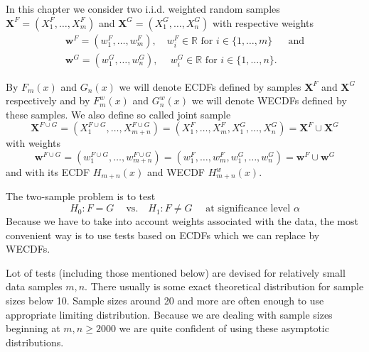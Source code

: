 In this chapter we consider two i.i.d. weighted random samples $\mathbf{X}^F = (X^F_1,\ldots, X^F_m)$ and $\mathbf{X}^G = (X^G_1, \ldots, X^G_n)$ with respective weights 
\begin{align*}
\mathbf{w}^F = (w^F_1,\ldots, w^F_m), \quad w_i^F \in \mathbb{R} \text{ for }  i \in \lbrace 1, \ldots, m \rbrace &\text{ and} \\
\mathbf{w}^G = (w^G_1,\ldots, w^G_n), \:
\quad w_i^G \in \mathbb{R} \text{ for } i \in \lbrace 1, \ldots, n \rbrace. &
\end{align*}

By $F_m(x) $ and $ G_n(x)$ we will denote ECDFs defined by samples $\mathbf{X}^F$ and $\mathbf{X}^G$ respectively and by $F^w_m(x)$ and $ G^w_n(x)$ we will denote WECDFs defined by these samples. We also define so called joint sample 
\begin{equation}
\mathbf{X}^{F\cup G} = (X^{F\cup G}_1, \ldots, X^{F\cup G}_{m+n}) = (X^{F}_1, \ldots, X^{F}_{m},X^G_1,\ldots, X^G_n) = \mathbf{X}^{F} \cup \mathbf{X}^{G}
\end{equation}
with weights 
\begin{equation}
\mathbf{w}^{F\cup G} = (w^{F\cup G}_1,\ldots, w^{F\cup G}_{m+n}) = (w^{F}_1,\ldots, w^{F}_{m},w^{G}_1,\ldots, w^{G}_{n}) = \mathbf{w}^{F} \cup \mathbf{w}^{G}
\end{equation}
and with its ECDF $H_{m+n}(x)$ and WECDF $H^w_{m+n}(x)$.


The two-sample problem is to test
\begin{equation}
H_0: F = G \quad\: \text{vs.}\quad H_1: F \neq G \quad\text{ at significance level } \alpha
\end{equation} 
Because we have to take into account weights associated with the data, the most convenient way is to use tests based on ECDFs which we can replace by WECDFs. 

Lot of tests (including those mentioned below) are devised for relatively small data samples $m,n$. There usually is some exact theoretical distribution for sample sizes below 10. Sample sizes around 20 and more are often enough to use appropriate limiting distribution. Because we are dealing with sample sizes beginning at $m,n \geq 2000$ we are quite confident of using these asymptotic distributions.


